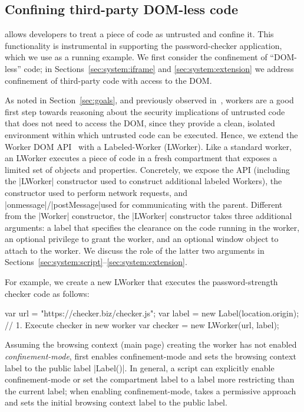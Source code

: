 \subsection{Confining third-party DOM-less code}
\label{sec:system:worker}

%
%
%
\sys{} allows developers to treat a piece of code as untrusted and
confine it. This functionality is instrumental in supporting the
password-checker application, which we use as a running example.
%
We first consider the confinement of ``DOM-less'' code; in
Sections~\ref{sec:system:iframe} and \ref{sec:system:extension} we
address confinement of third-party code with access to the DOM.

As noted in Section~\ref{sec:goals}, and previously observed
in~\cite{Ingram:2012}, workers are a good first step towards reasoning
about the security implications of untrusted code that does not need
to access the DOM, since they provide a clean, isolated environment
within which untrusted code can be executed.
%
Hence, we extend the Worker DOM API~\cite{workers} with a
Labeled-Worker (LWorker).
%
Like a standard worker, an LWorker executes a piece of code in a fresh
compartment that exposes a limited set of objects and properties.
%
Concretely, we expose the \sys{} API (including the \js|LWorker|
constructor used to construct additional labeled Workers), the \xhr{}
constructor used to perform network requests, and
\js|onmessage|/\js|postMessage|used for communicating with the
parent.
%
Different from the \js|Worker| constructor, the \js|LWorker|
constructor takes three additional arguments: a label that specifies the
clearance on the code running in the worker, an optional privilege
to grant the worker, and an optional window object to attach to the worker.
%
We discuss the role of the latter two arguments in Sections~\ref{sec:system:script}--\ref{sec:system:extension}.

For example, we create a new LWorker that executes the
password-strength checker code as follows:
\begin{jscode}
var url = "https://checker.biz/checker.js";
var label = new Label(location.origin);
// 1. Execute checker in new worker
var checker = new LWorker(url, label);
\end{jscode}
%
Assuming the browsing context (main page) creating the worker has not
enabled \emph{confinement-mode}, \sys{} first enables confinement-mode
and sets the browsing context label to the public label \js|Label()|.
%
In general, a script can explicitly enable confinement-mode or set
the compartment label to a label more restricting than the current
label; when enabling confinement-mode, \sys{} takes a
permissive approach and sets the initial browsing context label to the
public label.
 
